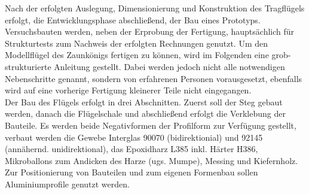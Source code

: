 Nach der erfolgten Auslegung, Dimensionierung und Konstruktion des Tragflügels erfolgt, die Entwicklungsphase abschließend, der Bau eines Prototyps. Versuchsbauten werden, neben der Erprobung der Fertigung, hauptsächlich für Strukturtests zum Nachweis der erfolgten Rechnungen genutzt. Um den Modellflügel des Zaunkönigs fertigen zu können, wird im Folgenden eine grob-strukturierte Anleitung gestellt. Dabei werden jedoch nicht alle notwendigen Nebenschritte genannt, sondern von erfahrenen Personen vorausgesetzt, ebenfalls wird auf eine vorherige Fertigung kleinerer Teile nicht eingegangen.\\

\noindent Der Bau des Flügels erfolgt in drei Abschnitten. Zuerst soll der Steg gebaut werden, danach die Flügelschale und abschließend erfolgt die Verklebung der Bauteile.
Es werden beide Negativformen der Profilform zur Verfügung gestellt, verbaut werden die Gewebe Interglas 90070 (bidirektionial) und 92145 (annähernd. unidirektional), das Epoxidharz L385 inkl. Härter H386, Mikroballons zum Andicken des Harze (ugs. Mumpe), Messing und Kiefernholz. Zur Positionierung von Bauteilen und zum eigenen Formenbau sollen Aluminiumprofile genutzt werden. 

